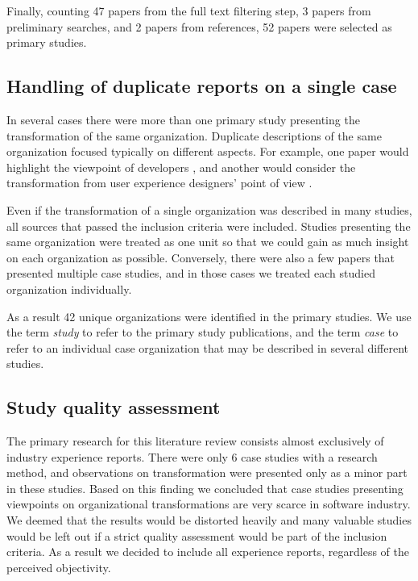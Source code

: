 Finally, counting 47 papers from the full text filtering step, 3 papers from
preliminary searches, and 2 papers from references, 52 papers were selected
as primary studies.


\subsection{Handling of duplicate reports on a single case}

In several cases there were more than one primary study presenting the
transformation of the same organization. Duplicate descriptions of the same
organization focused typically on different aspects. For example, one paper
would highlight the viewpoint of developers \citep{Fry2007}, and another would
consider the transformation from user experience designers' point of view
\citep{Federoff2009}.

Even if the transformation of a single organization was described in many
studies, all sources that passed the inclusion criteria were included. Studies
presenting the same organization were treated as one unit so that we could gain
as much insight on each organization as possible. Conversely, there were also a
few papers that presented multiple case studies, and in those cases we treated
each studied organization individually.

As a result 42 unique organizations were identified in the primary studies. We
use the term \emph{study} to refer to the primary study publications, and the
term \emph{case} to refer to an individual case organization that may be
described in several different studies.


\subsection{Study quality assessment}

The primary research for this literature review consists almost exclusively of
industry experience reports. There were only 6 case studies with a research
method, and observations on transformation were presented only as a minor part
in these studies. Based on this finding we concluded that case studies
presenting viewpoints on organizational transformations are very scarce in
software industry. We deemed that the results would be distorted heavily and
many valuable studies would be left out if a strict quality assessment would be
part of the inclusion criteria. As a result we decided to include all experience
reports, regardless of the perceived objectivity.

